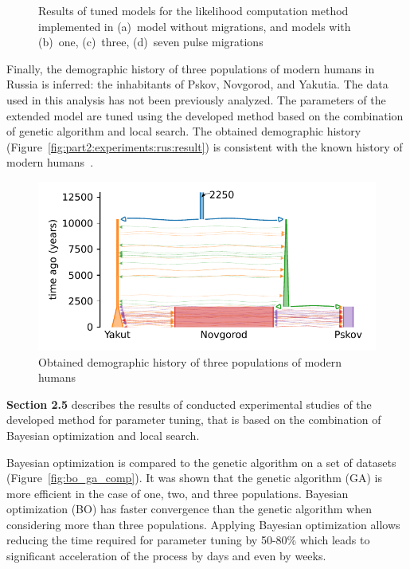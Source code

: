 \begin{figure}[ht]
\begin{subfigure}[b]{0.24\linewidth}
        \caption{}
    \end{subfigure}
    \caption{Results of tuned models for the likelihood computation method implemented in \momi (a)~model without migrations, and models with (b)~one, (c)~three, (d)~seven pulse migrations}
\end{figure}

Finally, the demographic history of three populations of modern humans in Russia is inferred: the inhabitants of Pskov, Novgorod, and Yakutia.
The data used in this analysis has not been previously analyzed.
The parameters of the extended model are tuned using the developed method based on the combination of genetic algorithm and local search.
The obtained demographic history (Figure~\ref{fig:part2:experiments:rus:result}) is consistent with the known history of modern humans~\cite{schraiber2015methods, nielsen2017tracing}.

\begin{figure}[ht]
\centering
\includegraphics[width=0.8\linewidth]{images_experiments/rus_genomes/picture_result.pdf}
\caption{Obtained demographic history of three populations of modern humans}
\end{figure}

\textbf{Section 2.5} describes the results of conducted experimental studies of the developed method for parameter tuning, that is based on the combination of Bayesian optimization and local search.

Bayesian optimization is compared to the genetic algorithm on a set of datasets (Figure~\ref{fig:bo_ga_comp}).
It was shown that the genetic algorithm (GA) is more efficient in the case of one, two, and three populations.
Bayesian optimization (BO) has faster convergence than the genetic algorithm when considering more than three populations.
Applying Bayesian optimization allows reducing the time required for parameter tuning by 50-80\% which leads to significant acceleration of the process by days and even by weeks.


